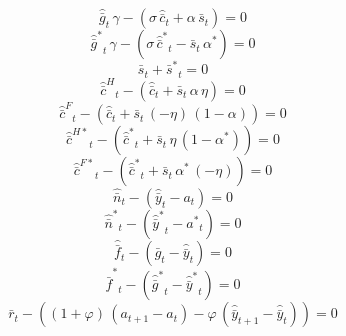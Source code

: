 \begin{dmath}
{{\hat {\bar g}}}_{t}\, {{\gamma}}-\left({{\sigma}}\, {{\hat {\bar c}}}_{t}+{{\alpha}}\, {{\bar s}}_{t}\right)=0
\end{dmath}
\begin{dmath}
{{\hat {\bar g}^*}}_{t}\, {{\gamma}}-\left({{\sigma}}\, {{\hat {\bar c}^*}}_{t}-{{\bar s}}_{t}\, {{\alpha^*}}\right)=0
\end{dmath}
\begin{dmath}
{{\bar s}}_{t}+{{\bar s^*}}_{t}=0
\end{dmath}
\begin{dmath}
{{\hat {\bar c}^H}}_{t}-\left({{\hat {\bar c}}}_{t}+{{\bar s}}_{t}\, {{\alpha}}\, {{\eta}}\right)=0
\end{dmath}
\begin{dmath}
{{\hat {\bar c}^F}}_{t}-\left({{\hat {\bar c}}}_{t}+{{\bar s}}_{t}\, \left(-{{\eta}}\right)\, \left(1-{{\alpha}}\right)\right)=0
\end{dmath}
\begin{dmath}
{{\hat {\bar c}^{H*}}}_{t}-\left({{\hat {\bar c}^*}}_{t}+{{\bar s}}_{t}\, {{\eta}}\, \left(1-{{\alpha^*}}\right)\right)=0
\end{dmath}
\begin{dmath}
{{\hat {\bar c}^{F*}}}_{t}-\left({{\hat {\bar c}^*}}_{t}+{{\bar s}}_{t}\, {{\alpha^*}}\, \left(-{{\eta}}\right)\right)=0
\end{dmath}
\begin{dmath}
{{\hat {\bar n}}}_{t}-\left({{\hat {\bar y}}}_{t}-{{a}}_{t}\right)=0
\end{dmath}
\begin{dmath}
{{\hat {\bar n}^*}}_{t}-\left({{\hat {\bar y}^*}}_{t}-{{a^*}}_{t}\right)=0
\end{dmath}
\begin{dmath}
{{\hat {\bar f}}}_{t}-\left({{\hat {\bar g}}}_{t}-{{\hat {\bar y}}}_{t}\right)=0
\end{dmath}
\begin{dmath}
{{\hat {\bar f}^*}}_{t}-\left({{\hat {\bar g}^*}}_{t}-{{\hat {\bar y}^*}}_{t}\right)=0
\end{dmath}
\begin{dmath}
{{\bar r}}_{t}-\left(\left(1+{{\varphi}}\right)\, \left({{a}}_{t+1}-{{a}}_{t}\right)-{{\varphi}}\, \left({{\hat {\bar y}}}_{t+1}-{{\hat {\bar y}}}_{t}\right)\right)=0
\end{dmath}

